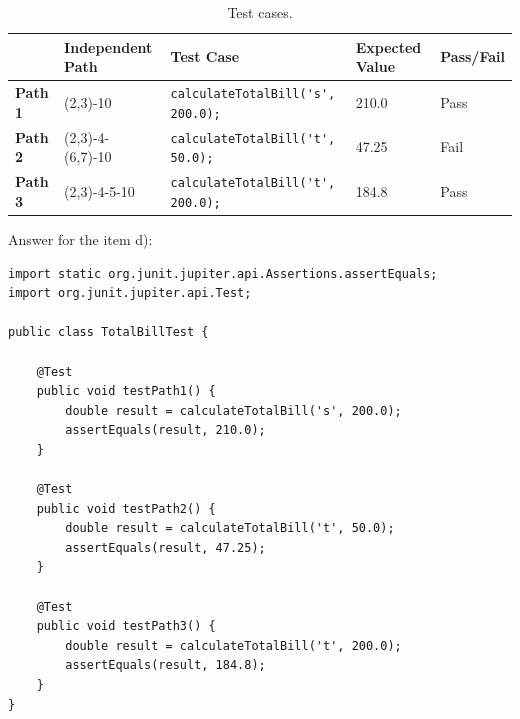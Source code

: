 \begin{solution}
    \begin{table}[H]
        \centering
        \renewcommand{\arraystretch}{1.2}
        \caption{Test cases.}
        \label{tab:ex3-test-cases}
        \begin{adjustbox}{max width=\textwidth}
            \begin{tabular}{lllll}
                \toprule
                 & Independent Path & Test Case & Expected Value & Pass/Fail\\
                \midrule
                \textbf{Path 1} & (2,3)-10 & \lstinline!calculateTotalBill('s', 200.0);! & 210.0 & Pass\\
                \textbf{Path 2} & (2,3)-4-(6,7)-10 & \lstinline!calculateTotalBill('t', 50.0);! & 47.25 & Fail\\
                \textbf{Path 3} & (2,3)-4-5-10 & \lstinline!calculateTotalBill('t', 200.0);! & 184.8 & Pass\\
                \bottomrule
            \end{tabular}
        \end{adjustbox}
    \end{table}
    
    Answer for the item d):
    \begin{lstlisting}[caption={A proposed answer for the item d).}]
import static org.junit.jupiter.api.Assertions.assertEquals;
import org.junit.jupiter.api.Test;

public class TotalBillTest {

    @Test
    public void testPath1() {
        double result = calculateTotalBill('s', 200.0);
        assertEquals(result, 210.0);
    }
    
    @Test
    public void testPath2() {
        double result = calculateTotalBill('t', 50.0);
        assertEquals(result, 47.25);
    }
    
    @Test
    public void testPath3() {
        double result = calculateTotalBill('t', 200.0);
        assertEquals(result, 184.8);
    }
}
    \end{lstlisting}

\end{solution}

